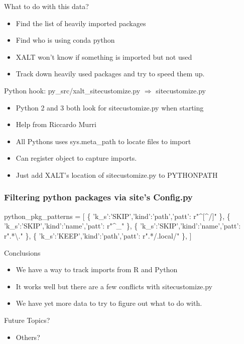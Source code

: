 \documentclass{beamer}
\begin{document}
\begin{frame}{What to do with this data?}
  \begin{itemize}
    \item Find the list of heavily imported packages
    \item Find who is using conda python
    \item XALT won't know if something is imported but not used
    \item Track down heavily used packages and try to speed them up.
  \end{itemize}
\end{frame}

\begin{frame}{Python hook: py\_src/xalt\_sitecustomize.py $\Rightarrow$ sitecustomize.py}
  \begin{itemize}
    \item Python 2 and 3 both look for  sitecustomize.py when starting
    \item Help from Riccardo Murri
    \item All Pythons uses sys.meta\_path to locate files to import
    \item Can register object to capture imports.
    \item Just add XALT's location of sitecustomize.py to PYTHONPATH
  \end{itemize}
\end{frame}

\begin{frame}[fragile]
    \frametitle{Filtering python packages via site's Config.py}
 {\small
    \begin{semiverbatim}
python\_pkg\_patterns = [
\{ 'k\_s':'SKIP','kind':'path','patt': r"^[^/]" \},
\{ 'k\_s':'SKIP','kind':'name','patt': r"^_"    \},
\{ 'k\_s':'SKIP','kind':'name','patt': r".*\textbackslash." \},
\{ 'k\_s':'KEEP','kind':'path','patt': r".*/.local/" \},
]
    \end{semiverbatim}
}
\end{frame}

\begin{frame}{Conclusions}
  \begin{itemize}
    \item We have a way to track imports from R and Python
    \item It works well but there are a few conflicts with
      sitecustomize.py
    \item We have yet more data to try to figure out what to do with.
  \end{itemize}
\end{frame}


\begin{frame}{Future Topics?}
  \begin{itemize}
    \item Others?
  \end{itemize}
\end{frame}
%

%
\end{document}
